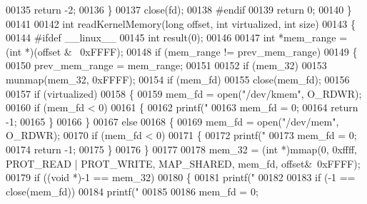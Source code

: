 \begin{DoxyCode}
00135         \textcolor{keywordflow}{return} -2;
00136     \}
00137     close(fd);
00138 \textcolor{preprocessor}{#endif}
00139     \textcolor{keywordflow}{return} 0;
00140 \}
00141 
00142 \textcolor{keywordtype}{int} readKernelMemory(\textcolor{keywordtype}{long} offset, \textcolor{keywordtype}{int} virtualized, \textcolor{keywordtype}{int} size)
00143 \{
00144 \textcolor{preprocessor}{#ifdef \_\_linux\_\_}
00145     \textcolor{keywordtype}{int} result(0);
00146 
00147     \textcolor{keywordtype}{int} *mem\_range = (\textcolor{keywordtype}{int} *)(offset & ~0xFFFF);
00148     \textcolor{keywordflow}{if} (mem\_range != prev\_mem\_range)
00149     \{
00150         prev\_mem\_range = mem\_range;
00151 
00152         \textcolor{keywordflow}{if} (mem\_32)
00153             munmap(mem\_32, 0xFFFF);
00154         \textcolor{keywordflow}{if} (mem\_fd)
00155             close(mem\_fd);
00156 
00157         \textcolor{keywordflow}{if} (virtualized)
00158         \{
00159             mem\_fd = open(\textcolor{stringliteral}{"/dev/kmem"}, O\_RDWR);
00160             \textcolor{keywordflow}{if} (mem\_fd < 0)
00161             \{
00162                 printf(\textcolor{stringliteral}{"%
00163                 mem\_fd = 0;
00164                 \textcolor{keywordflow}{return} -1;
00165             \}
00166         \}
00167         \textcolor{keywordflow}{else}
00168         \{
00169             mem\_fd = open(\textcolor{stringliteral}{"/dev/mem"}, O\_RDWR);
00170             \textcolor{keywordflow}{if} (mem\_fd < 0)
00171             \{
00172                 printf(\textcolor{stringliteral}{"%
00173                 mem\_fd = 0;
00174                 \textcolor{keywordflow}{return} -1;
00175             \}
00176         \}
00177 
00178         mem\_32 = (\textcolor{keywordtype}{int} *)mmap(0, 0xffff, PROT\_READ | PROT\_WRITE, MAP\_SHARED, mem\_fd, offset&~0xFFFF);
00179         \textcolor{keywordflow}{if} ((\textcolor{keywordtype}{void} *)-1 == mem\_32)
00180         \{
00181             printf(\textcolor{stringliteral}{"%
00182 
00183             \textcolor{keywordflow}{if} (-1 == close(mem\_fd))
00184                 printf(\textcolor{stringliteral}{"%
00185 
00186             mem\_fd = 0;
}}}}
\end{DoxyCode}
